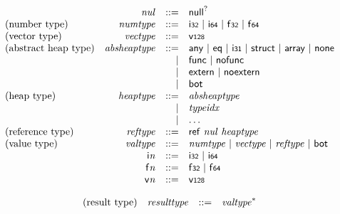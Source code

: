 $$
\begin{array}{@{}lrrl@{}l@{}}
& {\mathit{nul}} &::=& {\mathsf{null}^?} \\
\mbox{(number type)} & {\mathit{numtype}} &::=& \mathsf{i{\scriptstyle32}} ~|~ \mathsf{i{\scriptstyle64}} ~|~ \mathsf{f{\scriptstyle32}} ~|~ \mathsf{f{\scriptstyle64}} \\
\mbox{(vector type)} & {\mathit{vectype}} &::=& \mathsf{v{\scriptstyle128}} \\
\mbox{(abstract heap type)} & {\mathit{absheaptype}} &::=& \mathsf{any} ~|~ \mathsf{eq} ~|~ \mathsf{i{\scriptstyle31}} ~|~ \mathsf{struct} ~|~ \mathsf{array} ~|~ \mathsf{none} \\ &&|&
\mathsf{func} ~|~ \mathsf{nofunc} \\ &&|&
\mathsf{extern} ~|~ \mathsf{noextern} \\ &&|&
\mathsf{bot} \\
\mbox{(heap type)} & {\mathit{heaptype}} &::=& {\mathit{absheaptype}} \\ &&|&
{\mathit{typeidx}} \\ &&|&
\dots \\
\mbox{(reference type)} & {\mathit{reftype}} &::=& \mathsf{ref}~{\mathit{nul}}~{\mathit{heaptype}} \\
\mbox{(value type)} & {\mathit{valtype}} &::=& {\mathit{numtype}} ~|~ {\mathit{vectype}} ~|~ {\mathit{reftype}} ~|~ \mathsf{bot} \\
& {\mathsf{i}}{{\mathit{n}}} &::=& \mathsf{i{\scriptstyle32}} ~|~ \mathsf{i{\scriptstyle64}} \\
& {\mathsf{f}}{{\mathit{n}}} &::=& \mathsf{f{\scriptstyle32}} ~|~ \mathsf{f{\scriptstyle64}} \\
& {\mathsf{v}}{{\mathit{n}}} &::=& \mathsf{v{\scriptstyle128}} \\
\end{array}
$$

\vspace{1ex}

$$
\begin{array}{@{}lrrl@{}l@{}}
\mbox{(result type)} & {\mathit{resulttype}} &::=& {{\mathit{valtype}}^\ast} \\
\end{array}
$$

\vspace{1ex}

